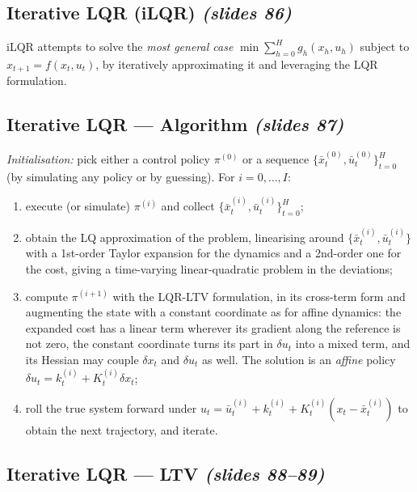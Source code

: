 \documentclass[11pt,a4paper]{article}
\newcommand{\slides}[1]{\emph{(slides #1)}}
\theoremstyle{plain}
\theoremstyle{definition}
\theoremstyle{remark}
\begin{document}
\subsection{Iterative LQR (iLQR) \slides{86}}

iLQR attempts to solve the \emph{most general case} $\min\sum_{h=0}^{H}g_h(x_h,u_h)$ subject to $x_{t+1}=f(x_t,u_t)$, by iteratively approximating it and leveraging the LQR formulation.

\subsection{Iterative LQR --- Algorithm \slides{87}}

\begin{algorithm}\label{alg:ilqr}
\emph{Initialisation:} pick either a control policy $\pi^{(0)}$ or a sequence $\{\bar x^{(0)}_t,\bar u^{(0)}_t\}_{t=0}^H$ (by simulating any policy or by guessing). For $i=0,\dots,I$:
\begin{enumerate}[nosep]
  \item execute (or simulate) $\pi^{(i)}$ and collect $\{\bar x^{(i)}_t,\bar u^{(i)}_t\}_{t=0}^H$;
  \item obtain the LQ approximation of the problem, linearising around $\{\bar x^{(i)}_t,\bar u^{(i)}_t\}$ with a 1st-order Taylor expansion for the dynamics and a 2nd-order one for the cost, giving a time-varying linear-quadratic problem in the deviations;
  \item compute $\pi^{(i+1)}$ with the LQR-LTV formulation, in its cross-term form and augmenting the state with a constant coordinate as for affine dynamics: the expanded cost has a linear term wherever its gradient along the reference is not zero, the constant coordinate turns its part in $\delta u_t$ into a mixed term, and its Hessian may couple $\delta x_t$ and $\delta u_t$ as well. The solution is an \emph{affine} policy $\delta u_t=k^{(i)}_t+K^{(i)}_t\delta x_t$;
  \item roll the true system forward under $u_t=\bar u^{(i)}_t+k^{(i)}_t+K^{(i)}_t(x_t-\bar x^{(i)}_t)$ to obtain the next trajectory, and iterate.
\end{enumerate}
\end{algorithm}

\subsection{Iterative LQR --- LTV \slides{88--89}}
\end{document}
